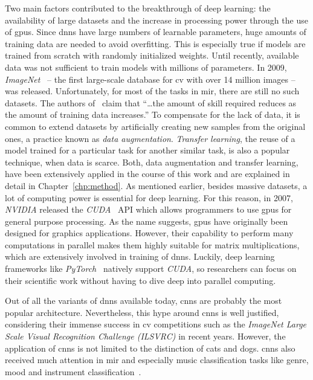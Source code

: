 Two main factors contributed to the breakthrough of deep learning: the availability of large datasets and the increase in processing power through the use of \glspl{gpu}. Since \glspl{dnn} have large numbers of learnable parameters, huge amounts of training data are needed to avoid overfitting. This is especially true if models are trained from scratch with randomly initialized weights. Until recently, available data was not sufficient to train models with millions of parameters. In 2009, \textit{ImageNet}~\cite{deng2009imagenet} -- the first large-scale database for \gls{cv} with over 14 million images -- was released. Unfortunately, for most of the tasks in \gls{mir}, there are still no such datasets. The authors of~\cite[p.~19]{goodfellow2016book} claim that \enquote{\dots the amount of skill required reduces as the amount of training data increases.} To compensate for the lack of data, it is common to extend datasets by artificially creating new samples from the original ones, a practice known as \textit{data augmentation}. \textit{Transfer learning}, the reuse of a model trained for a particular task for another similar task, is also a popular technique, when data is scarce. Both, data augmentation and transfer learning, have been extensively applied in the course of this work and are explained in detail in Chapter~\ref{chp:method}. As mentioned earlier, besides massive datasets, a lot of computing power is essential for deep learning. For this reason, in 2007, \textit{NVIDIA} released the \textit{CUDA}~\cite{nickolls2008cuda} API which allows programmers to use \glspl{gpu} for general purpose processing. As the name suggests, \glspl{gpu} have originally been designed for graphics applications. However, their capability to perform many computations in parallel makes them highly suitable for matrix multiplications, which are extensively involved in training of \glspl{dnn}. Luckily, deep learning frameworks like \textit{PyTorch}~\cite{paszke2019pytorch} natively support \textit{CUDA}, so researchers can focus on their scientific work without having to dive deep into parallel computing.

Out of all the variants of \glspl{dnn} available today, \glspl{cnn} are probably the most popular architecture. Nevertheless, this hype around \glspl{cnn} is well justified, considering their immense success in \gls{cv} competitions such as the \textit{ImageNet Large Scale Visual Recognition Challenge (ILSVRC)} in recent years. However, the application of \glspl{cnn} is not limited to the distinction of cats and dogs. \Glspl{cnn} also received much attention in \gls{mir} and especially music classification tasks like genre, mood and instrument classification~\cite{nam2018deep}.


